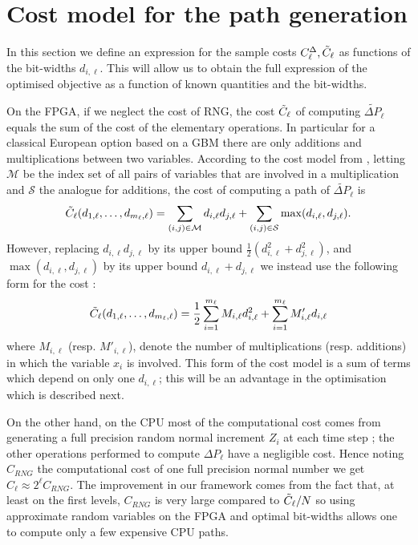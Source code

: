 \section{Cost model for the path generation}\label{sec:costModel}
In this section we define an expression for the sample costs $C^{\Delta}_\ell, \Tilde{C}_\ell$ as functions of the bit-widths $d_{i,\ell}$. This will allow us to obtain the full expression of the optimised objective as a function of known quantities and the bit-widths.

On the FPGA, if we neglect the cost of RNG, the cost $\Tilde{C}_\ell$ of computing $\widetilde{\Delta P}_\ell$ equals the sum of the cost of the elementary operations. In particular for a classical European option based on a GBM there are only additions and multiplications between two variables. 
According to the cost model from \cite{Lee2006}, letting $\mathcal{M}$ be the index set of all pairs of variables that are involved in a multiplication and $\mathcal{S}$ the analogue for additions, the cost of computing a path of $\widetilde{\Delta P}_\ell$ is 
\begin{equation} \label{cost_real}
    \Tilde{C}_\ell(d_{1,\ell},\ldots,d_{m_\ell,\ell}) = \sum_{(i,j) \in \mathcal{M}}  d_{i,\ell} d_{j,\ell} + \sum_{(i,j) \in \mathcal{S}}  \max(d_{i,\ell},d_{j,\ell}). %
\end{equation}
However, replacing $d_{i,\ell} d_{j,\ell}$ by its upper bound $\frac{1}{2}(d^2_{i,\ell} + d^2_{j,\ell})$, and $\max(d_{i,\ell},d_{j,\ell})$ by its upper bound $d_{i,\ell}+d_{j,\ell}$ we instead use the following form for the cost :
\begin{equation} \label{cost_sq} 
    \Tilde{C}_\ell(d_{1,\ell},\ldots,d_{m_\ell,\ell}) = \frac{1}{2}\sum_{i=1}^{m_\ell} M_{i,\ell} d_{i,\ell}^2 + \sum_{i=1}^{m_\ell} M'_{i,\ell} d_{i,\ell}
\end{equation}
where $M_{i,\ell}$ (resp. $ M'_{i,\ell}$), denote the number of multiplications (resp. additions) in which the variable $x_i$ %
is involved. %
This form of the cost model is a sum of terms which depend on only one $d_{i,\ell}$; this will be an advantage in the optimisation which is described next.

On the other hand, on the CPU most of the computational cost comes from generating a full precision random normal increment $Z_i$ at each time step ; the other operations performed to compute $\Delta P_\ell$ have a negligible cost. Hence noting $C_{RNG}$ the computational cost of one full precision normal number we get $C_\ell \approx 2^\ell C_{RNG}$.
The improvement in our framework comes from the fact that, at least on the first levels, $C_{RNG}$ is very large compared to $\Tilde{C}_\ell/N$ so using approximate random variables on the FPGA and optimal bit-widths allows one to compute only a few expensive CPU paths.



